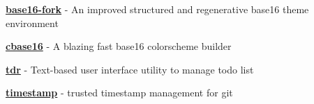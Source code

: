 
\begin{cvparagraph}


\hfill
\begin{cvitems}

\item{\href{https://github.com/base16-fork}{\textbf{base16-fork}} - An improved structured and regenerative base16 theme environment}
\item{\href{https://github.com/Z5483/cbase16}{\textbf{cbase16}} - A blazing fast base16 colorscheme builder}
\item{\href{https://github.com/Z5483/tdr}{\textbf{tdr}} - Text-based user interface utility to manage todo list}
\item{\href{https://github.com/Z5483/timestamp}{\textbf{timestamp}} - trusted timestamp management for git}

\end{cvitems}

\end{cvparagraph}
